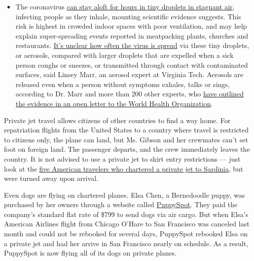 \begin{itemize}
  \begin{itemize}
  \tightlist
  \item
    The coronavirus
    \href{https://www.nytimes3xbfgragh.onion/2020/07/04/health/239-experts-with-one-big-claim-the-coronavirus-is-airborne.html?action=click\&pgtype=Article\&state=default\&region=MAIN_CONTENT_3\&context=storylines_faq}{can
    stay aloft for hours in tiny droplets in stagnant air}, infecting
    people as they inhale, mounting scientific evidence suggests. This
    risk is highest in crowded indoor spaces with poor ventilation, and
    may help explain super-spreading events reported in meatpacking
    plants, churches and restaurants.
    \href{https://www.nytimes3xbfgragh.onion/2020/07/06/health/coronavirus-airborne-aerosols.html?action=click\&pgtype=Article\&state=default\&region=MAIN_CONTENT_3\&context=storylines_faq}{It's
    unclear how often the virus is spread} via these tiny droplets, or
    aerosols, compared with larger droplets that are expelled when a
    sick person coughs or sneezes, or transmitted through contact with
    contaminated surfaces, said Linsey Marr, an aerosol expert at
    Virginia Tech. Aerosols are released even when a person without
    symptoms exhales, talks or sings, according to Dr. Marr and more
    than 200 other experts, who
    \href{https://academic.oup.com/cid/article/doi/10.1093/cid/ciaa939/5867798}{have
    outlined the evidence in an open letter to the World Health
    Organization}.
  \end{itemize}
\end{itemize}

Private jet travel allows citizens of other countries to find a way
home. For repatriation flights from the United States to a country where
travel is restricted to citizens only, the plane can land, but Ms.
Gibson and her crewmates can't set foot on foreign land. The passenger
departs, and the crew immediately leaves the country. It is not advised
to use a private jet to skirt entry restrictions --- just look at the
\href{https://www.nytimes3xbfgragh.onion/2020/07/07/world/europe/american-passport-privilege-coronavirus.html}{five
American travelers who chartered a private jet to Sardinia}, but were
turned away upon arrival.

Even dogs are flying on chartered planes. Elsa Chen, a Bernedoodle
puppy, was purchased by her owners through a website called
\href{https://www.puppyspot.com/}{PuppySpot}. They paid the company's
standard flat rate of \$799 to send dogs via air cargo. But when Elsa's
American Airlines flight from Chicago O'Hare to San Francisco was
canceled last month and could not be rebooked for several days,
PuppySpot rebooked Elsa on a private jet and had her arrive in San
Francisco nearly on schedule. As a result, PuppySpot is now flying all
of its dogs on private planes.

